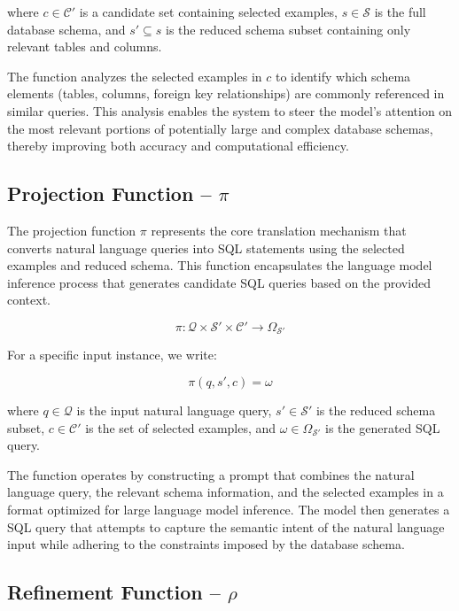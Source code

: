 \vspace{0.5em}

where $c \in \mathcal{C}'$ is a candidate set containing selected examples, $s \in \mathcal{S}$
is the full database schema, and $s' \subseteq s$ is the reduced schema subset containing
only relevant tables and columns.

The function analyzes the selected examples in $c$ to identify which schema elements
(tables, columns, foreign key relationships) are commonly referenced in similar queries.
This analysis enables the system to steer the model's attention on the most relevant
portions of potentially large and complex database schemas, thereby improving both accuracy
and computational efficiency.

\subsection{Projection Function – $\pi$}

The projection function $\pi$ represents the core translation mechanism that converts
natural language queries into SQL statements using the selected examples and reduced schema.
This function encapsulates the language model inference process that generates candidate
SQL queries based on the provided context.

$$
\pi: \mathcal{Q} \times \mathcal{S}' \times \mathcal{C}' \rightarrow \Omega_{\mathcal{S}'}
$$

\vspace{0.5em}

For a specific input instance, we write:

$$
\pi(q, s', c) = \omega
$$

\vspace{0.5em}

where $q \in \mathcal{Q}$ is the input natural language query, $s' \in \mathcal{S}'$ is
the reduced schema subset, $c \in \mathcal{C}'$ is the set of selected examples,
and $\omega \in \Omega_{\mathcal{S}'}$ is the generated SQL query.

The function operates by constructing a prompt that combines the natural language
query, the relevant schema information, and the selected examples in a format
optimized for large language model inference. The model then generates a SQL query
that attempts to capture the semantic intent of the natural language input while
adhering to the constraints imposed by the database schema.

\subsection{Refinement Function – $\rho$}

